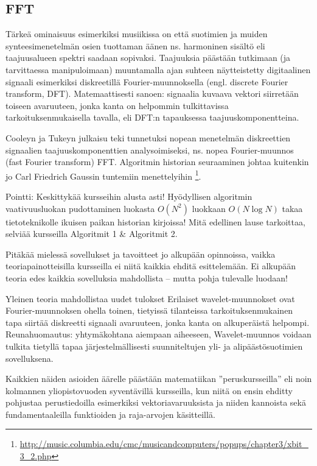 \documentclass[pdf,10pt]{beamer}
\begin{document}
\subsection{FFT}

\begin{frame}
  Tärkeä ominaisuus esimerkiksi musiikissa on että suotimien ja muiden
  synteesimenetelmän osien tuottaman äänen ns. harmoninen sisältö eli
  taajuusalueen spektri saadaan sopivaksi. Taajuuksia päästään
  tutkimaan (ja tarvittaessa manipuloimaan) muuntamalla ajan suhteen
  näytteistetty digitaalinen signaali esimerkiksi diskreetillä
  Fourier-muunnoksella (engl. discrete Fourier transform,
  DFT). Matemaattisesti sanoen: signaalia kuvaava vektori siirretään
  toiseen avaruuteen, jonka kanta on helpommin tulkittavissa
  tarkoituksenmukaisella tavalla, eli DFT:n tapauksessa
  taajuuskomponentteina.
\end{frame}

\begin{frame}
  Cooleyn ja Tukeyn julkaisu \cite{CooleyTukey1965fft} teki tunnetuksi
  nopean menetelmän diskreettien signaalien taajuuskomponenttien
  analysoimiseksi, ns. nopea Fourier-muunnos (fast Fourier transform)
  FFT. Algoritmin historian seuraaminen johtaa kuitenkin jo Carl
  Friedrich Gaussin tuntemiin menettelyihin
  \footnote{\url{http://music.columbia.edu/cmc/musicandcomputers/popups/chapter3/xbit_3_2.php}}.
\end{frame}


\begin{frame}{Pointti: Keskittykää kursseihin alusta asti!}
  Hyödyllisen algoritmin vaativuusluokan pudottaminen luokasta
  $O(N^2)$ luokkaan $O(N \mathop{log} N)$ takaa tietoteknikolle
  ikuisen paikan historian kirjoissa! Mitä edellinen lause tarkoittaa,
  selviää kursseilla Algoritmit 1 \& Algoritmit 2.

  Pitäkää mielessä sovellukset ja tavoitteet jo alkupään opinnoissa,
  vaikka teoriapainotteisilla kursseilla ei niitä kaikkia ehditä
  esittelemään. Ei alkupään teoria edes kaikkia sovelluksia
  mahdollista -- mutta pohja tulevalle luodaan!
  
\end{frame}

\begin{frame}{Yleinen teoria mahdollistaa uudet tulokset}
  Erilaiset wavelet-muunnokset \cite{daubechies1990wavelet} ovat
  Fourier-muunnoksen ohella toinen, tietyissä tilanteissa
  tarkoituksenmukainen tapa siirtää diskreetti signaali avaruuteen,
  jonka kanta on alkuperäistä helpompi. Reunahuomautus: yhtymäkohtana
  aiempaan aiheeseen, Wavelet-muunnos voidaan tulkita tietyllä tapaa
  järjestelmällisesti suunniteltujen yli- ja alipäästösuotimien sovelluksena.

  Kaikkien näiden asioiden äärelle päästään matematiikan
  ''peruskursseilla'' eli noin kolmannen yliopistovuoden syventävillä
  kursseilla, kun niitä on ensin ehditty pohjustaa perustiedoilla
  esimerkiksi vektoriavaruuksista ja niiden kannoista sekä
  fundamentaaleilla funktioiden ja raja-arvojen käsitteillä.

\end{frame}
\end{document}
